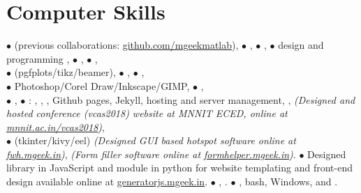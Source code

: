 \vspace{-2.5em}
\section{Computer Skills}
{\scriptsize$\bullet$}  (previous collaborations: \href{https://github.com/mgeekmatlab}{github.com/mgeekmatlab}), {\scriptsize$\bullet$} , {\scriptsize$\bullet$} , {\scriptsize$\bullet$}  design and programming , {\scriptsize$\bullet$} , {\scriptsize$\bullet$} ,\\ 
{\scriptsize$\bullet$}  (pgfplots/tikz/beamer), {\scriptsize$\bullet$} , {\scriptsize$\bullet$} ,\\
{\scriptsize$\bullet$} Photoshop/Corel Draw/Inkscape/GIMP, {\scriptsize$\bullet$} , \\
{\scriptsize$\bullet$} , {\scriptsize$\bullet$} : , , , Github pages, Jekyll, hosting and server management, ,  \emph{(Designed and hosted conference (vcas2018) website at MNNIT ECED, online at \href{http://mnnit.ac.in/vcas2018}{mnnit.ac.in/vcas2018})}, \\
{\scriptsize$\bullet$}  (tkinter/kivy/eel) \emph{(Designed GUI based hotspot software online at \href{https://fwh.mgeek.in}{fwh.mgeek.in})}, \emph{(Form filler software online at \href{https://formhelper.mgeek.in}{formhelper.mgeek.in})}. {\scriptsize$\bullet$} Designed  library in JavaScript and  module in python for website templating and front-end design available online at \href{https://generatorjs.mgeek.in}{generatorjs.mgeek.in}. {\scriptsize$\bullet$} , . {\scriptsize$\bullet$} , bash, Windows, and .\\
\vspace{-1em}
\sectionline